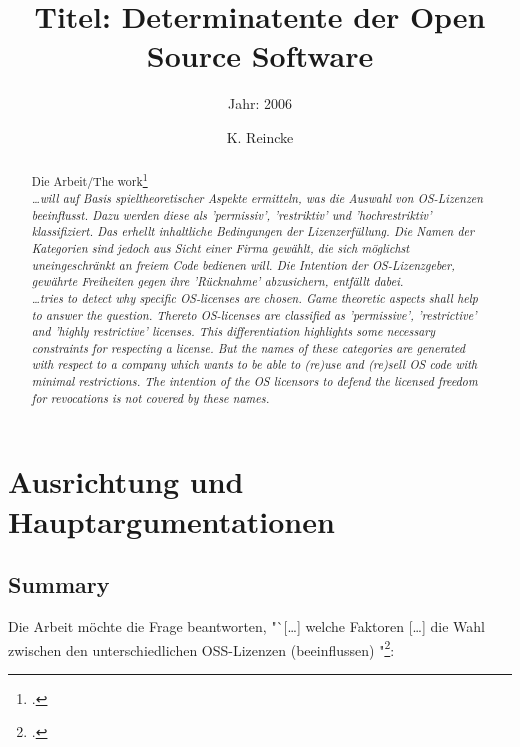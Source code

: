 \documentclass[DIV=calc,BCOR=5mm,11pt,headings=small,oneside,abstract=true, toc=bib]{scrartcl}
\begin{document}

\titlehead{Literaturexzerpt}
\subject{Autor: Rouven Buchtala}
\title{Titel: Determinatente der Open Source Software}
\subtitle{Jahr: 2006 }
\author{K. Reincke}
\maketitle

\begin{abstract}
\noindent
Die Arbeit/The work\footcite[][]{Buchtala2007a} \\
\noindent \itshape
\ldots will auf Basis spieltheoretischer Aspekte ermitteln, was die
Auswahl von OS-Lizenzen beeinflusst. Dazu werden diese als 'permissiv',
'restriktiv' und 'hochrestriktiv' klassifiziert. Das erhellt inhaltliche
Bedingungen der Lizenzerfüllung. Die Namen der Kategorien sind jedoch aus Sicht
einer Firma gewählt, die sich möglichst uneingeschränkt an freiem Code bedienen
will. Die Intention der OS-Lizenzgeber, gewährte Freiheiten gegen ihre
'Rücknahme' abzusichern, entfällt dabei. \\
\noindent
\ldots tries to detect why specific OS-licenses are chosen. Game
theoretic aspects shall help to answer the question. Thereto OS-licenses are
classified as 'permissive', 'restrictive' and 'highly restrictive' licenses.
This differentiation highlights some necessary constraints for respecting a
license. But the names of these categories are generated with respect to a
company which wants to be able to (re)use and (re)sell OS code with minimal
restrictions. The intention of the OS licensors to defend the licensed freedom
for revocations is not covered by these names.
\end{abstract}
\footnotesize
\normalsize

\section{Ausrichtung und Hauptargumentationen}

\subsection{Summary}
Die Arbeit möchte die Frage beantworten, "`[\ldots] welche Faktoren [\ldots] die
Wahl zwischen den unterschiedlichen OSS-Lizenzen (beeinflussen)
"\footcite[cf.][25]{Buchtala2007a}:
\end{document}
